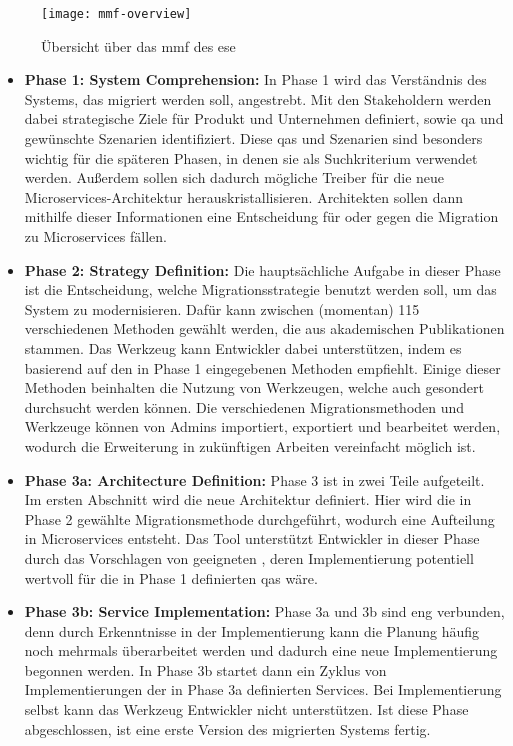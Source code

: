 \begin{figure}
	\centering
	\texttt{[image: mmf-overview]}
	\caption[\acrfull{mmf} Übersicht]{
		Übersicht über das \gls{mmf} des \gls{ese}
	}
	\label{fig:expert-material-mmf-overview}
\end{figure}

\begin{itemize}
	\item \textbf{Phase 1: System Comprehension:}
	In Phase 1 wird das Verständnis des Systems, das migriert werden soll, angestrebt.
	Mit den Stakeholdern werden dabei strategische Ziele für Produkt und Unternehmen definiert, sowie \acrfull{qa} und gewünschte Szenarien identifiziert.
	Diese \glspl{qa} und Szenarien sind besonders wichtig für die späteren Phasen, in denen sie als Suchkriterium verwendet werden.
	Außerdem sollen sich dadurch mögliche Treiber für die neue Microservices-Architektur herauskristallisieren.
	Architekten sollen dann mithilfe dieser Informationen eine Entscheidung für oder gegen die Migration zu Microservices fällen.
	\item \textbf{Phase 2: Strategy Definition:}
	Die hauptsächliche Aufgabe in dieser Phase ist die Entscheidung, welche Migrationsstrategie benutzt werden soll, um das System zu modernisieren.
	Dafür kann zwischen (momentan) 115 verschiedenen Methoden gewählt werden, die aus akademischen Publikationen stammen.
	Das Werkzeug kann Entwickler dabei unterstützen, indem es basierend auf den in Phase 1 eingegebenen  Methoden empfiehlt.
	Einige dieser Methoden beinhalten die Nutzung von Werkzeugen, welche auch gesondert durchsucht werden können.
	Die verschiedenen Migrationsmethoden und Werkzeuge können von Admins importiert, exportiert und bearbeitet werden, wodurch die Erweiterung in zukünftigen Arbeiten vereinfacht möglich ist.
	\item \textbf{Phase 3a: Architecture Definition:}
	Phase 3 ist in zwei Teile aufgeteilt.
	Im ersten Abschnitt wird die neue Architektur definiert.
	Hier wird die in Phase 2 gewählte Migrationsmethode durchgeführt, wodurch eine Aufteilung in Microservices entsteht.
	Das Tool unterstützt Entwickler in dieser Phase durch das Vorschlagen von geeigneten \bpp, deren Implementierung potentiell wertvoll für die in Phase 1 definierten \glspl{qa} wäre.
	\item \textbf{Phase 3b: Service Implementation:} 
	Phase 3a und 3b sind eng verbunden, denn durch Erkenntnisse in der Implementierung kann die Planung häufig noch mehrmals überarbeitet werden und dadurch eine neue Implementierung begonnen werden.
	In Phase 3b startet dann ein Zyklus von Im\-ple\-men\-tie\-rung\-en der in Phase 3a definierten Services.
	Bei Implementierung selbst kann das Werkzeug Entwickler nicht unterstützen.
	Ist diese Phase abgeschlossen, ist eine erste Version des migrierten Systems fertig.
\end{itemize}

